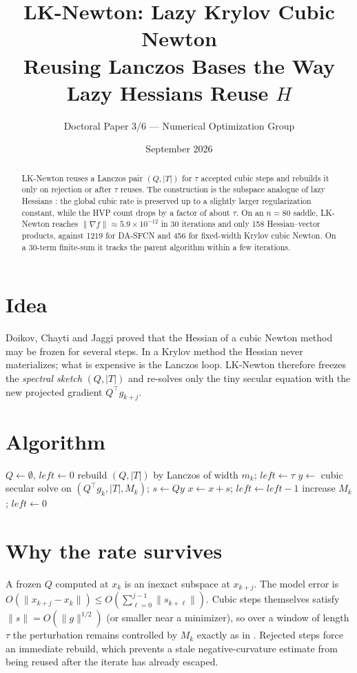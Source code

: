 \documentclass[11pt,a4paper]{article}
\title{\textbf{LK-Newton: Lazy Krylov Cubic Newton}\\
\large Reusing Lanczos Bases the Way Lazy Hessians Reuse $H$}
\author{Doctoral Paper 3/6 --- Numerical Optimization Group}
\date{September 2026}
\begin{document}
\maketitle
\begin{abstract}
LK-Newton reuses a Lanczos pair $(Q,|T|)$ for $\tau$ accepted cubic steps
and rebuilds it only on rejection or after $\tau$ reuses. The construction
is the subspace analogue of lazy Hessians \cite{doikov2023}: the global
cubic rate is preserved up to a slightly larger regularization constant,
while the HVP count drops by a factor of about $\tau$. On an $n=80$
saddle, LK-Newton reaches $\|\nabla f\|\approx 5.9\times 10^{-12}$ in 30
iterations and only 158 Hessian--vector products, against 1219 for
DA-SFCN and 456 for fixed-width Krylov cubic Newton. On a 30-term
finite-sum it tracks the parent algorithm within a few iterations.
\end{abstract}

\section{Idea}
Doikov, Chayti and Jaggi \cite{doikov2023} proved that the Hessian of a
cubic Newton method may be frozen for several steps. In a Krylov method
the Hessian never materializes; what is expensive is the Lanczos loop.
LK-Newton therefore freezes the \emph{spectral sketch} $(Q,|T|)$ and
re-solves only the tiny secular equation with the new projected gradient
$Q^\top g_{k+j}$.

\section{Algorithm}
\begin{algorithm}[h]
\caption{LK-Newton}
\begin{algorithmic}[1]
\State $Q\gets\emptyset$, $\textit{left}\gets 0$
        rebuild $(Q,|T|)$ by Lanczos of width $m_k$; $\textit{left}\gets\tau$
  \EndIf
  \State $y\gets$ cubic secular solve on $(Q^\top g_k,|T|,M_k)$; $s\gets Qy$
   $x\gets x+s$; $\textit{left}\gets\textit{left}-1$
  \Else{} increase $M_k$; $\textit{left}\gets 0$
  \EndIf
\EndFor
\end{algorithmic}
\end{algorithm}

\section{Why the rate survives}
A frozen $Q$ computed at $x_k$ is an inexact subspace at $x_{k+j}$.
The model error is $O(\|x_{k+j}-x_k\|)\le O(\sum_{\ell=0}^{j-1}\|s_{k+\ell}\|)$.
Cubic steps themselves satisfy $\|s\|=O(\|g\|^{1/2})$ (or smaller near a
minimizer), so over a window of length $\tau$ the perturbation remains
controlled by $M_k$ exactly as in \cite{doikov2023}. Rejected steps force
an immediate rebuild, which prevents a stale negative-curvature estimate
from being reused after the iterate has already escaped.
\end{document}
